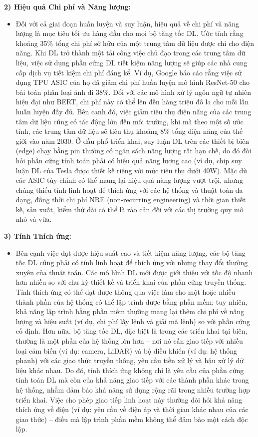 \documentclass[a4paper]{article}
\begin{document}
\textbf{2) Hiệu quả Chi phí và Năng lượng:}

\begin{itemize}
    \item Đối với cả giai đoạn huấn luyện và suy luận, hiệu quả về chi phí và năng lượng là mục tiêu tối ưu hàng đầu cho mọi bộ tăng tốc DL. Ước tính rằng khoảng 35\% tổng chi phí sở hữu của một trung tâm dữ liệu được chi cho điện năng. Khi DL trở thành một tải công việc chủ đạo trong các trung tâm dữ liệu, việc sử dụng phần cứng DL tiết kiệm năng lượng sẽ giúp các nhà cung cấp dịch vụ tiết kiệm chi phí đáng kể. Ví dụ, Google báo cáo rằng việc sử dụng TPU ASIC của họ đã giảm chi phí huấn luyện mô hình ResNet-50 cho bài toán phân loại ảnh đi 38\%. Đối với các mô hình xử lý ngôn ngữ tự nhiên hiện đại như BERT, chi phí này có thể lên đến hàng triệu đô la cho mỗi lần huấn luyện đầy đủ. Bên cạnh đó, việc giảm tiêu thụ điện năng của các trung tâm dữ liệu cũng có tác động lớn đến môi trường, khi mà theo một số ước tính, các trung tâm dữ liệu sẽ tiêu thụ khoảng 8\% tổng điện năng của thế giới vào năm 2030. Ở đầu phổ triển khai, suy luận DL trên các thiết bị biên (edge) chạy bằng pin thường có ngân sách năng lượng rất hạn chế, do đó đòi hỏi phần cứng tính toán phải có hiệu quả năng lượng cao (ví dụ, chip suy luận DL của Tesla được thiết kế riêng với mức tiêu thụ dưới 40W). Mặc dù các ASIC tùy chỉnh có thể mang lại hiệu quả năng lượng vượt trội, nhưng chúng thiếu tính linh hoạt để thích ứng với các hệ thống và thuật toán đa dạng, đồng thời chi phí NRE (non-recurring engineering) và thời gian thiết kế, sản xuất, kiểm thử dài có thể là rào cản đối với các thị trường quy mô nhỏ và vừa.
\end{itemize}

\textbf{3) Tính Thích ứng:}

\begin{itemize}
    \item Bên cạnh việc đạt được hiệu suất cao và tiết kiệm năng lượng, các bộ tăng tốc DL cũng phải có tính linh hoạt để thích ứng với những thay đổi thường xuyên của thuật toán. Các mô hình DL mới được giới thiệu với tốc độ nhanh hơn nhiều so với chu kỳ thiết kế và triển khai của phần cứng truyền thống. Tính thích ứng có thể đạt được thông qua việc làm cho một hoặc nhiều thành phần của hệ thống có thể lập trình được bằng phần mềm; tuy nhiên, khả năng lập trình bằng phần mềm thường mang lại thêm chi phí về năng lượng và hiệu suất (ví dụ, chi phí lấy lệnh và giải mã lệnh) so với phần cứng cố định. Hơn nữa, bộ tăng tốc DL, đặc biệt là trong các triển khai tại biên, thường là một phần của hệ thống lớn hơn – nơi nó cần giao tiếp với nhiều loại cảm biến (ví dụ: camera, LiDAR) và bộ điều khiển (ví dụ: hệ thống phanh) với các giao thức truyền thông, yêu cầu tiền xử lý và hậu xử lý dữ liệu khác nhau. Do đó, tính thích ứng không chỉ là yêu cầu của phần cứng tính toán DL mà còn của khả năng giao tiếp với các thành phần khác trong hệ thống, nhằm đảm bảo khả năng sử dụng rộng rãi trong nhiều trường hợp triển khai. Việc cho phép giao tiếp linh hoạt này thường đòi hỏi khả năng thích ứng về điện (ví dụ: yêu cầu về điện áp và thời gian khác nhau của các giao thức) – điều mà lập trình phần mềm không thể đảm bảo một cách độc lập.
\end{itemize}
\end{document}
